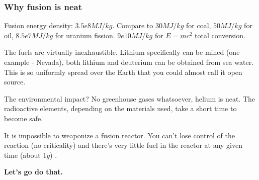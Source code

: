 \documentclass[PlasmaNotes.tex]{subfiles}
\begin{document}
\subsubsection{Why fusion is neat}

Fusion energy density: $3.5e8 MJ/kg$. Compare to $30 MJ/kg$ for coal, $50 MJ/kg$ for oil, $8.5e7 MJ/kg$ for uranium fission. $9e10 MJ/kg$ for $E=mc^2$ total conversion.

The fuels are virtually inexhaustible. Lithium specifically can be mined (one example - Nevada), both lithium and deuterium can be obtained from sea water. This is so uniformly spread over the Earth that you could almost call it open source.

The environmental impact? No greenhouse gases whatsoever, helium is neat. The radioactive elements, depending on the materials used, take a short time to become safe.

It is impossible to weaponize a fusion reactor. You can't lose control of the reaction (no criticality) and there's very little fuel in the reactor at any given time (about $1g$) .


\begin{center}
\textbf{Let's go do that.}
\end{center}
\end{document}

